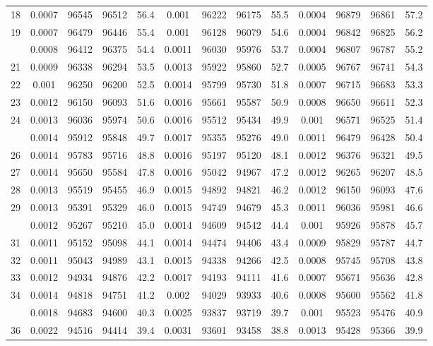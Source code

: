 \documentclass[
  14pt,
]{article}
\begin{document}
\begin{longtable}[t]{lcccccccccccc}
18 & 0.0007 & 96545 & 96512 & 56.4 & 0.001 & 96222 & 96175 & 55.5 & 0.0004 & 96879 & 96861 & 57.2\\
19 & 0.0007 & 96479 & 96446 & 55.4 & 0.001 & 96128 & 96079 & 54.6 & 0.0004 & 96842 & 96825 & 56.2\\
\addlinespace
20 & 0.0008 & 96412 & 96375 & 54.4 & 0.0011 & 96030 & 95976 & 53.7 & 0.0004 & 96807 & 96787 & 55.2\\
21 & 0.0009 & 96338 & 96294 & 53.5 & 0.0013 & 95922 & 95860 & 52.7 & 0.0005 & 96767 & 96741 & 54.3\\
22 & 0.001 & 96250 & 96200 & 52.5 & 0.0014 & 95799 & 95730 & 51.8 & 0.0007 & 96715 & 96683 & 53.3\\
23 & 0.0012 & 96150 & 96093 & 51.6 & 0.0016 & 95661 & 95587 & 50.9 & 0.0008 & 96650 & 96611 & 52.3\\
24 & 0.0013 & 96036 & 95974 & 50.6 & 0.0016 & 95512 & 95434 & 49.9 & 0.001 & 96571 & 96525 & 51.4\\
\addlinespace
25 & 0.0014 & 95912 & 95848 & 49.7 & 0.0017 & 95355 & 95276 & 49.0 & 0.0011 & 96479 & 96428 & 50.4\\
26 & 0.0014 & 95783 & 95716 & 48.8 & 0.0016 & 95197 & 95120 & 48.1 & 0.0012 & 96376 & 96321 & 49.5\\
27 & 0.0014 & 95650 & 95584 & 47.8 & 0.0016 & 95042 & 94967 & 47.2 & 0.0012 & 96265 & 96207 & 48.5\\
28 & 0.0013 & 95519 & 95455 & 46.9 & 0.0015 & 94892 & 94821 & 46.2 & 0.0012 & 96150 & 96093 & 47.6\\
29 & 0.0013 & 95391 & 95329 & 46.0 & 0.0015 & 94749 & 94679 & 45.3 & 0.0011 & 96036 & 95981 & 46.6\\
\addlinespace
30 & 0.0012 & 95267 & 95210 & 45.0 & 0.0014 & 94609 & 94542 & 44.4 & 0.001 & 95926 & 95878 & 45.7\\
31 & 0.0011 & 95152 & 95098 & 44.1 & 0.0014 & 94474 & 94406 & 43.4 & 0.0009 & 95829 & 95787 & 44.7\\
32 & 0.0011 & 95043 & 94989 & 43.1 & 0.0015 & 94338 & 94266 & 42.5 & 0.0008 & 95745 & 95708 & 43.8\\
33 & 0.0012 & 94934 & 94876 & 42.2 & 0.0017 & 94193 & 94111 & 41.6 & 0.0007 & 95671 & 95636 & 42.8\\
34 & 0.0014 & 94818 & 94751 & 41.2 & 0.002 & 94029 & 93933 & 40.6 & 0.0008 & 95600 & 95562 & 41.8\\
\addlinespace
35 & 0.0018 & 94683 & 94600 & 40.3 & 0.0025 & 93837 & 93719 & 39.7 & 0.001 & 95523 & 95476 & 40.9\\
36 & 0.0022 & 94516 & 94414 & 39.4 & 0.0031 & 93601 & 93458 & 38.8 & 0.0013 & 95428 & 95366 & 39.9\\

\end{longtable}
\end{document}
